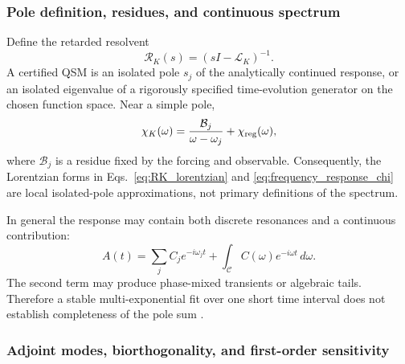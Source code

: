     \subsubsection*{Pole definition, residues, and continuous spectrum}

        Define the retarded resolvent
        \begin{equation}
            \mathcal R_K(s)
            =
            (sI-\mathcal L_K)^{-1}.
            \label{eq:rt_qss_resolvent}
        \end{equation}
        A certified QSM is an isolated pole \(s_j\) of the analytically continued
        response, or an isolated eigenvalue of a rigorously specified time-evolution
        generator on the chosen function space.  Near a simple pole,
        \begin{equation}
            \chi_K(\omega)
            =
            \frac{\mathcal B_j}
            {\omega-\omega_j}
            +
            \chi_{\rm reg}(\omega),
            \label{eq:rt_qss_local_pole}
        \end{equation}
        where \(\mathcal B_j\) is a residue fixed by the forcing and observable.
        Consequently, the Lorentzian forms in
        Eqs.~\eqref{eq:RK_lorentzian} and
        \eqref{eq:frequency_response_chi} are local isolated-pole approximations, not
        primary definitions of the spectrum.

        In general the response may contain both discrete resonances and a continuous
        contribution:
        \begin{equation}
            A(t)
            =
            \sum_j
            C_j e^{-i\omega_jt}
            +
            \int_{\mathcal C}
            C(\omega)e^{-i\omega t}\,d\omega.
            \label{eq:rt_qss_poles_and_continuum}
        \end{equation}
        The second term may produce phase-mixed transients or algebraic tails.
        Therefore a stable multi-exponential fit over one short time interval does not
        establish completeness of the pole sum
        \cite{BertiEtAl2026BlackHoleSpectroscopy}.

    \subsubsection*{Adjoint modes, biorthogonality, and first-order sensitivity}

